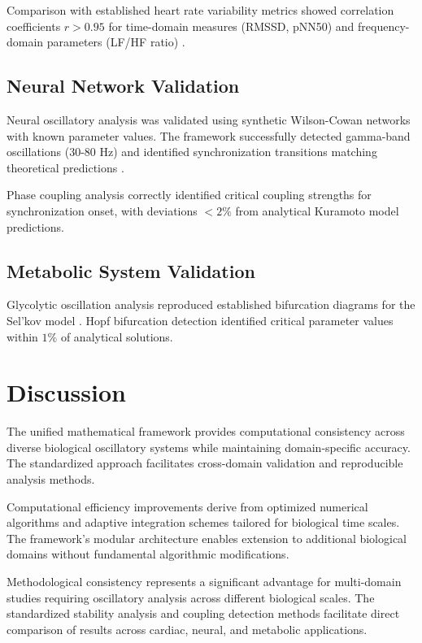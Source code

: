 \documentclass[twocolumn]{article}
\begin{document}
Comparison with established heart rate variability metrics showed correlation coefficients $r > 0.95$ for time-domain measures (RMSSD, pNN50) and frequency-domain parameters (LF/HF ratio) \citep{task1996heart}.

\subsection{Neural Network Validation}

Neural oscillatory analysis was validated using synthetic Wilson-Cowan networks with known parameter values. The framework successfully detected gamma-band oscillations (30-80 Hz) and identified synchronization transitions matching theoretical predictions \citep{brunel2003dynamics}.

Phase coupling analysis correctly identified critical coupling strengths for synchronization onset, with deviations $< 2\%$ from analytical Kuramoto model predictions.

\subsection{Metabolic System Validation}

Glycolytic oscillation analysis reproduced established bifurcation diagrams for the Sel'kov model \citep{sel'kov1968self}. Hopf bifurcation detection identified critical parameter values within $1\%$ of analytical solutions.

\section{Discussion}

The unified mathematical framework provides computational consistency across diverse biological oscillatory systems while maintaining domain-specific accuracy. The standardized approach facilitates cross-domain validation and reproducible analysis methods.

Computational efficiency improvements derive from optimized numerical algorithms and adaptive integration schemes tailored for biological time scales. The framework's modular architecture enables extension to additional biological domains without fundamental algorithmic modifications.

Methodological consistency represents a significant advantage for multi-domain studies requiring oscillatory analysis across different biological scales. The standardized stability analysis and coupling detection methods facilitate direct comparison of results across cardiac, neural, and metabolic applications.
\end{document}
